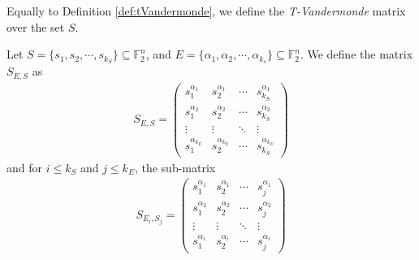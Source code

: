 \documentclass[11pt]{llncs}
\begin{document}
Equally to Definition \ref{def:tVandermonde}, we define the \textit{T-Vandermonde} matrix over the set $S$.
\begin{definition}
    Let $S = \{s_1, s_2, \cdots, s_{k_S}\} \subseteq \mathbb{F}_2^n$, and $E = \{\alpha_1, \alpha_2, \cdots, \alpha_{k_s}\} \subseteq \mathbb{F}_2^n$. We define the matrix $S_{E,S}$ as
    \begin{align*}
        S_{E,S} = 
        \begin{pmatrix}
            s_1^{\alpha_1} & s_2^{\alpha_1} & \cdots & s_{k_S}^{\alpha_1} \\
            s_1^{\alpha_2} & s_2^{\alpha_2} & \cdots & s_{k_S}^{\alpha_2} \\
            \vdots & \vdots & \ddots & \vdots \\
            s_1^{\alpha_{k_E}} & s_{2}^{\alpha_{k_E}} & \cdots & s_{k_S}^{\alpha_{k_E}}
        \end{pmatrix}
    \end{align*}
    and for $i \leq k_S$ and $j\leq k_E$, the sub-matrix
    \begin{align*}
    S_{E_i, S_j} = 
    \begin{pmatrix}
            s_1^{\alpha_1} & s_2^{\alpha_1} & \cdots & s_{j}^{\alpha_1} \\
            s_1^{\alpha_2} & s_2^{\alpha_2} & \cdots & s_{j}^{\alpha_2} \\
            \vdots & \vdots & \ddots & \vdots \\
            s_1^{\alpha_{i}} & s_{2}^{\alpha_{i}} & \cdots & s_{j}^{\alpha_{i}}
        \end{pmatrix}    
    \end{align*}
\end{definition}
\end{document}
